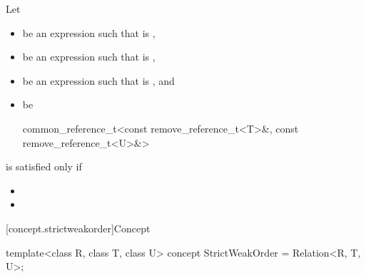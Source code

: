\begin{itemdescr}
\pnum
Let
\begin{itemize}
\item {} be an expression such that  is ,
\item {} be an expression such that  is ,
\item {} be an expression such that  is ,
  and
\item {} be
  \begin{codeblock}
  common_reference_t<const remove_reference_t<T>&,
  const remove_reference_t<U>&>
  \end{codeblock}
\end{itemize}
 is satisfied only if

\begin{itemize}
\item {}
\item {}
\end{itemize}
\end{itemdescr}

[concept.strictweakorder]{Concept }

%
\begin{itemdecl}
template<class R, class T, class U>
  concept StrictWeakOrder = Relation<R, T, U>;
\end{itemdecl}

